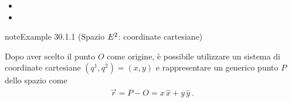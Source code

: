 \documentclass[letterpaper,10pt,italian]{jupyterBook}
\begin{document}
\sphinxAtStartPar
{}
\begin{itemize}
\item {} 
\sphinxAtStartPar
{}

\item {} 
\sphinxAtStartPar
{}

\end{itemize}
\label{ch/vector-calculus/geometry:def-cartesian-coords-e2}
\begin{sphinxadmonition}{note}{Example 30.1.1 (Spazio \protect\(E^2\protect\): coordinate cartesiane)}



\sphinxAtStartPar
Dopo aver scelto il punto \(O\) come origine, è possibile utilizzare un sistema di coordinate cartesiane \((q^1, q^2) = (x,y)\) e rappresentare un generico punto \(P\) dello spazio come
\begin{equation*}
\begin{split}\vec{r} = P - O = x \, \hat{x} + y \, \hat{y} \ .\end{split}
\end{equation*}\end{sphinxadmonition}
\label{ch/vector-calculus/geometry:def-polar-coords-e2}
\end{document}
